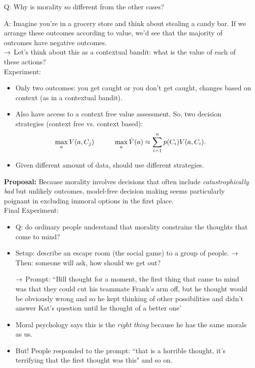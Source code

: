 Q: Why is morality so different from the other cases? 

A: Imagine you're in a grocery store and think about stealing a candy bar. If we arrange these outcomes according to value, we'd see that the majority of outcomes have negative outcomes. \\

$\rightarrow$ Let's think about this as a contextual bandit: what is the value of each of these actions? \\

Experiment:
\begin{itemize}
    \item Only two outcomes: you get caught or you don't get caught, changes based on context (as in a contextual bandit).
    \item Also have access to a context free value assessment. So, two decision strategies (context free vs. context based):
    \begin{align}
        &\max_a V(a, C_j)\hspace{10mm} \max_a \hat{V}(a) \approx \nsum p(C_i) V(a,C_i).
    \end{align}
    
    \item Given different amount of data, should use different strategies.
\end{itemize}

{\bf Proposal:} Because morality involves decisions that often include {\it catastrophically bad} but unlikely outcomes, model-free decision making seems particularly poignant in excluding immoral options in the first place. \\

Final Experiment:
\begin{itemize}
    \item Q: do ordinary people understand that morality constrains the thoughts that come to mind?
    \item Setup: describe an escape room (the social game) to a group of people.
    $\rightarrow$ Then: someone will ask, how should we get out? 
    
    $\rightarrow$ Prompt: ``Bill thought for a moment, the first thing that came to mind was that they could cut his teammate Frank's arm off, but he thought would be obviously wrong and so he kept thinking of other possibilities and didn't answer Kat's question until he thought of a better one'
    
    \item Moral psychology says this is the {\it right thing} because he has the same morals as us.
    
    \item But! People responded to the prompt: ``that is a horrible thought, it's terrifying that the first thought was this" and so on.
    
\end{itemize}

